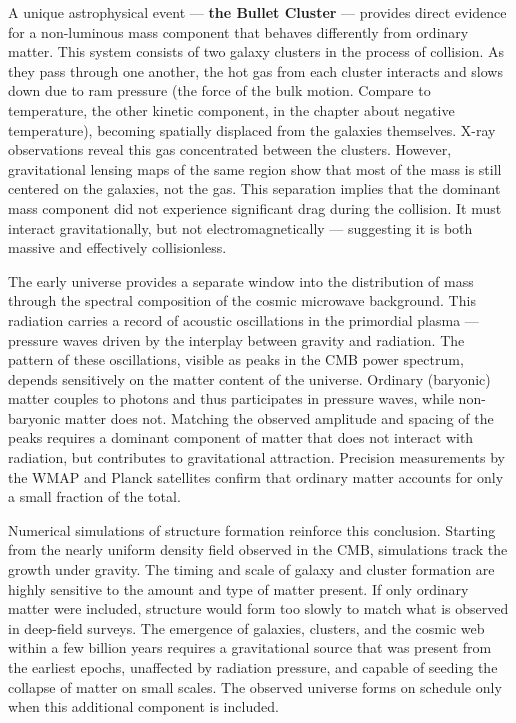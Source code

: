 A unique astrophysical event — \textbf{the Bullet Cluster} — provides direct evidence for a non-luminous mass component that behaves differently from ordinary matter. This system consists of two galaxy clusters in the process of collision. As they pass through one another, the hot gas from each cluster interacts and slows down due to ram pressure (the force of the bulk motion. Compare to temperature, the other kinetic component, in the chapter about negative temperature), becoming spatially displaced from the galaxies themselves. X-ray observations reveal this gas concentrated between the clusters. However, gravitational lensing maps of the same region show that most of the mass is still centered on the galaxies, not the gas. This separation implies that the dominant mass component did not experience significant drag during the collision. It must interact gravitationally, but not electromagnetically — suggesting it is both massive and effectively collisionless.

The early universe provides a separate window into the distribution of mass through the spectral composition of the cosmic microwave background. This radiation carries a record of acoustic oscillations in the primordial plasma — pressure waves driven by the interplay between gravity and radiation. The pattern of these oscillations, visible as peaks in the CMB power spectrum, depends sensitively on the matter content of the universe. Ordinary (baryonic) matter couples to photons and thus participates in pressure waves, while non-baryonic matter does not. Matching the observed amplitude and spacing of the peaks requires a dominant component of matter that does not interact with radiation, but contributes to gravitational attraction. Precision measurements by the WMAP and Planck satellites confirm that ordinary matter accounts for only a small fraction of the total.

Numerical simulations of structure formation reinforce this conclusion. Starting from the nearly uniform density field observed in the CMB, simulations track the growth under gravity. The timing and scale of galaxy and cluster formation are highly sensitive to the amount and type of matter present. If only ordinary matter were included, structure would form too slowly to match what is observed in deep-field surveys. The emergence of galaxies, clusters, and the cosmic web within a few billion years requires a gravitational source that was present from the earliest epochs, unaffected by radiation pressure, and capable of seeding the collapse of matter on small scales. The observed universe forms on schedule only when this additional component is included.


